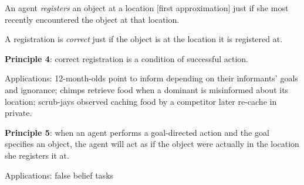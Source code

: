 \documentclass[11pt]{extarticle}
\begin{document}
\begin{multicols}{3}
An agent \emph{registers} an object at a location [first approximation] just if she most recently encountered the object at that location.

A registration is \emph{correct} just if the object is at the location it is registered at.

\textbf{Principle 4}: correct registration is a condition of successful action.

Applications: 12-month-olds point to inform depending on their informants’ goals and ignorance;\citep{Liszkowski:2008al} chimps retrieve food when a dominant is misinformed about its location;\citep{Hare:2001ph} scrub-jays observed caching food by a competitor later re-cache in private.\citep{Clayton:2007fh,Emery:2007ze}

 
\textbf{Principle 5}: when an agent performs a goal-directed action and the goal specifies an object, the agent will act as if the object were actually in the location she registers it at.

Applications: false belief tasks \citep{Onishi:2005hm,Southgate:2007js,Buttelmann:2009gy}




\footnotesize 


\end{multicols}
\end{document}
